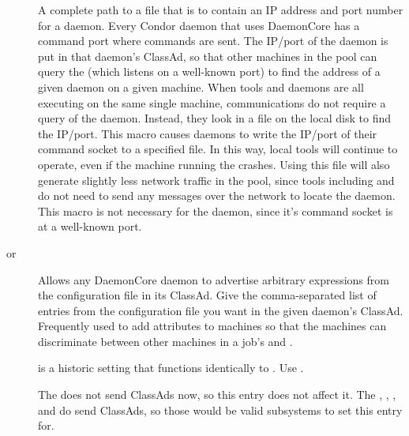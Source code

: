 \begin{description}
\item[]
  \label{param:SubsysAddressFile}
  \index{}
  A complete path to a file that is to contain an
  IP address and port number for a daemon. 
  Every Condor daemon that uses
  DaemonCore has a command port where commands are sent.
  The IP/port of the daemon is put in that daemon's ClassAd,
  so that other machines in the pool can query the
   (which listens on a well-known port)
  to find the address of a given daemon on a given machine.
  When tools and daemons are all executing on the same
  single machine, communications do not require a query of the
   daemon.
  Instead, they look in a file on the local disk
  to find the IP/port.
  This macro causes daemons to write the
  IP/port of their command socket to a specified file.
  In this way,
  local tools will continue to operate,
  even if the machine running the  crashes.
  Using this file will also generate
  slightly less network traffic in the pool,
  since tools including  and
   do not need to send any messages over the network to
  locate the  daemon.
  This macro is not necessary for the  
  daemon, since it's command socket is at a well-known port.  
  
\item[ or \label{param:SubsysExprs}
  ] \label{param:SubsysAttrs}
  Allows any DaemonCore daemon to advertise arbitrary
  expressions from the configuration file in its ClassAd.  Give the
  comma-separated list of entries from the configuration file you want in the
  given daemon's ClassAd.
  Frequently used to add attributes to machines so that the
  machines can discriminate between other machines in a job's 
   and .

   is a historic setting that functions identically to
  . Use .

  \Note The  does not send
  ClassAds now, so this entry does not affect it.  The
  , , , and
   do send ClassAds, so those would be valid
  subsystems to set this entry for.
  

\end{description}
